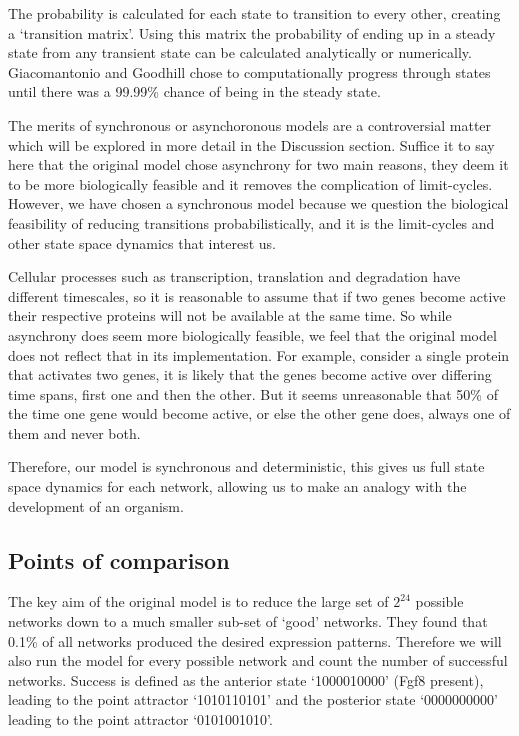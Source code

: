 \documentclass[a4paper,11pt]{article}
\begin{document}
The probability is calculated for each state to transition to every other, creating a `transition matrix'. Using this matrix the probability of ending up in a steady state from any transient state can be calculated analytically or numerically. Giacomantonio and Goodhill chose to computationally progress through states until there was a 99.99\% chance of being in the steady state.\par

The merits of synchronous or asynchoronous models are a controversial matter which will be explored in more detail in the Discussion section. Suffice it to say here that the original model chose asynchrony for two main reasons, they deem it to be more biologically feasible and it removes the complication of limit-cycles. However, we have chosen a synchronous model because we question the biological feasibility of reducing transitions probabilistically, and it is the limit-cycles and other state space dynamics that interest us. \par

Cellular processes such as transcription, translation and degradation have different timescales, so it is reasonable to assume that if two genes become active their respective proteins will not be available at the same time. So while asynchrony does seem more biologically feasible, we feel that the original model does not reflect that in its implementation. For example, consider a single protein that activates two genes, it is likely that the genes become active over differing time spans, first one and then the other. But it seems unreasonable that 50\% of the time one gene would become active, or else the other gene does, always one of them and never both.\par

Therefore, our model is synchronous and deterministic, this gives us full state space dynamics for each network, allowing us to make an analogy with the development of an organism.\par


\subsection{Points of comparison}
The key aim of the original model is to reduce the large set of $2^{24}$ possible networks down to a much smaller sub-set of `good' networks. They found that 0.1\% of all networks produced the desired expression patterns. Therefore we will also run the model for every possible network and count the number of successful networks. Success is defined as the anterior state `1000010000' (Fgf8 present), leading to the point attractor `1010110101' and the posterior state `0000000000' leading to the point attractor `0101001010'.\par
\end{document}
